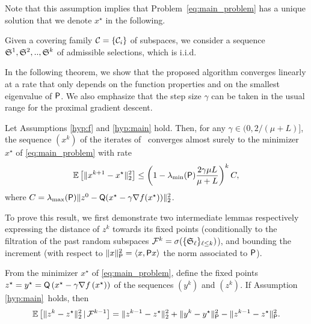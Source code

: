 Note that this assumption implies that Problem~\eqref{eq:main_problem} has a unique solution that we denote $x^\star$ in the following.


\begin{assumption}\label{hyp:main}
Given a covering family $\mathcal{C}=\{ \mathcal{C}_i \}$ of subspaces, we consider a sequence $\mathfrak{S}^1,\mathfrak{S}^2,..,\mathfrak{S}^k$ of admissible selections, which is i.i.d.
\end{assumption}

In the following theorem, we show that the proposed algorithm converges linearly at a rate that only depends on the function properties and on the smallest eigenvalue of ${\mathsf{P}}$.
We also emphasize that the step size $\gamma$ can be taken in the usual range for the proximal gradient descent.  


\begin{theorem}\label{th:conv_nondis}
Let Assumptions \ref{hyp:f} and  \ref{hyp:main} hold. Then, for any $\gamma\in(0,2/(\mu+L)]$, the sequence $(x^k)$ of the iterates of \algo~converges almost surely to the minimizer  $x^\star$  of \eqref{eq:main_problem} with rate
$$
\mathbb{E}\left[\|x^{k+1} - x^\star\|_2^2\right] \leq \left(1 - \lambda_{\min}({\mathsf{P}}) \frac{2\gamma\mu L}{\mu + L} \right)^k C,
$$
where $C = \lambda_{\max}({\mathsf{P}})\|z^0 - {\mathsf{Q}}(x^\star - \gamma\nabla f(x^\star))\|_2^2$.
\end{theorem}

To prove this result, we first demonstrate two intermediate lemmas respectively expressing the distance of $z^k$ towards its fixed points (conditionally to the filtration of the past random subspaces $\mathcal{F}^k = \sigma( \{\mathfrak{S}_\ell\}_{\ell\leq k} )$), and bounding the increment (with respect to $\| x \|_{{\mathsf{P}}}^2 = \langle x , {\mathsf{P}} x \rangle $ the norm associated to ${\mathsf{P}}$).


\begin{lemma}\label{lm:removing_exp}
From the minimizer  $x^\star$  of \eqref{eq:main_problem}, define the fixed points $z^\star = y^\star = {\mathsf{Q}}\left(x^\star - \gamma\nabla f\left(x^\star\right)\right)$ of the sequences $(y^k)$ and $(z^k)$.  If Assumption \ref{hyp:main}~holds, then 
    $$
    \mathbb{E}\left[\|z^{k} - z^\star\|_2^2\,|\,\mathcal{F}^{k-1}\right] = \|z^{k-1}-z^\star\|_2^2 + \|y^{k}-y^\star\|_{{\mathsf{P}}}^2 -  \|z^{k-1}-z^\star\|_{{\mathsf{P}}}^2.
    $$
\end{lemma}

